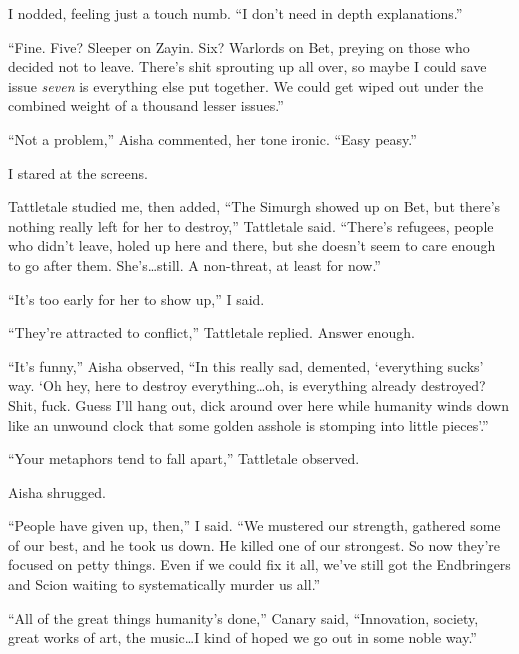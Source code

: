 I nodded, feeling just a touch numb.  ``I don't need in depth explanations.''



``Fine.  Five?  Sleeper on Zayin.  Six?  Warlords on Bet, preying on those who decided not to leave.  There's shit sprouting up all over, so maybe I could save issue \emph{seven} is everything else put together.  We could get wiped out under the combined weight of a thousand lesser issues.''



``Not a problem,'' Aisha commented, her tone ironic.  ``Easy peasy.''



I stared at the screens.



Tattletale studied me, then added, ``The Simurgh showed up on Bet, but there's nothing really left for her to destroy,'' Tattletale said.  ``There's refugees, people who didn't leave, holed up here and there, but she doesn't seem to care enough to go after them.  She's\ldots still.  A non-threat, at least for now.''



``It's too early for her to show up,'' I said.



``They're attracted to conflict,'' Tattletale replied.  Answer enough.



``It's funny,'' Aisha observed, ``In this really sad, demented, `everything sucks' way.  `Oh hey, here to destroy everything\ldots oh, is everything already destroyed?  Shit, fuck.  Guess I'll hang out, dick around over here while humanity winds down like an unwound clock that some golden asshole is stomping into little pieces'.''



``Your metaphors tend to fall apart,'' Tattletale observed.



Aisha shrugged.



``People have given up, then,'' I said.  ``We mustered our strength, gathered some of our best, and he took us down.  He killed one of our strongest.  So now they're focused on petty things.  Even if we could fix it all, we've still got the Endbringers and Scion waiting to systematically murder us all.''



``All of the great things humanity's done,'' Canary said, ``Innovation, society, great works of art, the music\ldots  I kind of hoped we go out in some noble way.''



